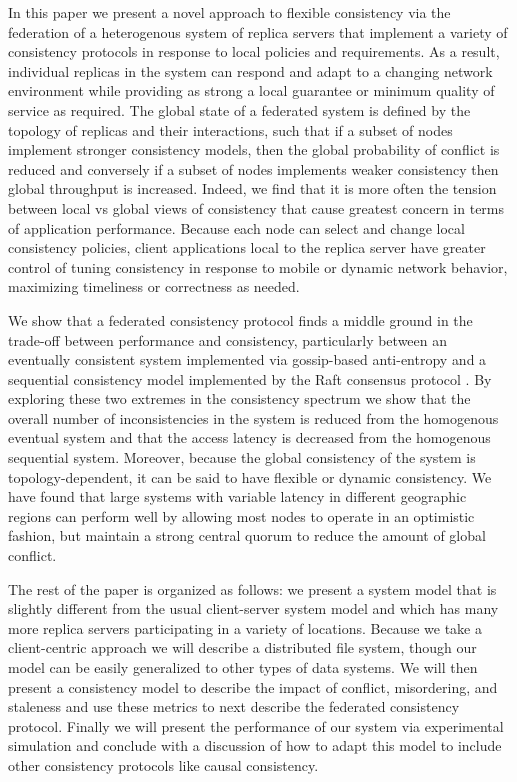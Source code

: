 \documentclass[10pt,conference,compsocconf,letterpaper]{IEEEtran}
\begin{document}
In this paper we present a novel approach to flexible consistency via the federation of a heterogenous system of replica servers that implement a variety of consistency protocols in response to local policies and requirements. As a result, individual replicas in the system can respond and adapt to a changing network environment while providing as strong a local guarantee or minimum quality of service as required. The global state of a federated system is defined by the topology of replicas and their interactions, such that if a subset of nodes implement stronger consistency models, then the global probability of conflict is reduced and conversely if a subset of nodes implements weaker consistency then global throughput is increased. Indeed, we find that it is more often the tension between local vs global views of consistency that cause greatest concern in terms of application performance. Because each node can select and change local consistency policies, client applications local to the replica server have greater control of tuning consistency in response to mobile or dynamic network behavior, maximizing timeliness or correctness as needed.

We show that a federated consistency protocol finds a middle ground in the trade-off between performance and consistency, particularly between an eventually consistent system implemented via gossip-based anti-entropy \cite{kempe_gossip-based_2003} and a sequential consistency model implemented by the Raft consensus protocol \cite{ongaro_search_2014}. By exploring these two extremes in the consistency spectrum we show that the overall number of inconsistencies in the system is reduced from the homogenous eventual system and that the access latency is decreased from the homogenous sequential system. Moreover, because the global consistency of the system is topology-dependent, it can be said to have flexible or dynamic consistency. We have found that large systems with variable latency in different geographic regions can perform well by allowing most nodes to operate in an optimistic fashion, but maintain a strong central quorum to reduce the amount of global conflict.

The rest of the paper is organized as follows: we present a system model that is slightly different from the usual client-server system model and which has many more replica servers participating in a variety of locations. Because we take a client-centric approach we will describe a distributed file system, though our model can be easily generalized to other types of data systems. We will then present a consistency model to describe the impact of conflict, misordering, and staleness and use these metrics to next describe the federated consistency protocol. Finally we will present the performance of our system via experimental simulation and conclude with a discussion of how to adapt this model to include other consistency protocols like causal consistency.
\end{document}
